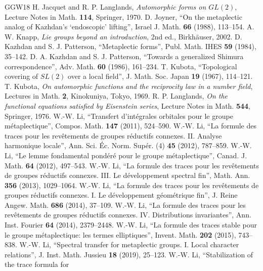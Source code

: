 \documentclass[12pt,letterpaper,openany]{book}
\numberwithin{equation}{chapter}
\theoremstyle{plain}
\theoremstyle{definition}
\theoremstyle{remark}
\theoremstyle{plain}
\begin{document}
\begin{thebibliography}{GGW18}
 H. Jacquet and R. P. Langlands, \emph{Automorphic forms on
$GL(2)$}, Lecture Notes in Math. \textbf{114}, Springer, 1970.
 D. Joyner, ``On the metaplectic analog of Kazhdan's
`endoscopic' lifting'', Israel J. Math. \textbf{66} (1988), 113--154.
 A. W. Knapp, \emph{Lie groups beyond an introduction}, 2nd ed.,
Birkh\"auser, 2002.
 D. Kazhdan and S. J. Patterson, ``Metaplectic forms'', Publ.
Math. IHES \textbf{59} (1984), 35--142.
 D. A. Kazhdan and S. J. Patterson, ``Towards a
generalized Shimura correspondence'', Adv. Math. \textbf{60} (1986),
161--234.
 T. Kubota, ``Topological covering of $SL(2)$ over a local
field'', J. Math. Soc. Japan \textbf{19} (1967), 114--121.
 T. Kubota, \emph{On automorphic functions and the reciprocity
law in a number field}, Lectures in Math. \textbf{2}, Kinokuniya, Tokyo, 1969.
 R. P. Langlands, \emph{On the functional equations satisfied
by Eisenstein series}, Lecture Notes in Math. \textbf{544}, Springer, 1976.
 W.-W. Li, ``Transfert d'int\'egrales orbitales pour le
groupe m\'etaplectique'', Compos. Math. \textbf{147} (2011), 524--590.
 W.-W. Li, ``La formule des traces pour les rev\^etements
de groupes r\'eductifs connexes. II. Analyse harmonique locale'', Ann. Sci.
\'Ec. Norm. Sup\'er. (4) \textbf{45} (2012), 787--859.
 W.-W. Li, ``Le lemme fondamental pond\'er\'e pour le
groupe m\'etaplectique'', Canad. J. Math. \textbf{64} (2012), 497--543.
 W.-W. Li, ``La formule des traces pour les
rev\^etements de groupes r\'eductifs connexes. III. Le d\'eveloppement
spectral fin'', Math. Ann. \textbf{356} (2013), 1029--1064.
 W.-W. Li, ``La formule des traces pour les rev\^etements
de groupes r\'eductifs connexes. I. Le d\'eveloppement g\'eom\'etrique fin'',
J. Reine Angew. Math. \textbf{686} (2014), 37--109.
 W.-W. Li, ``La formule des traces pour les rev\^etements
de groupes r\'eductifs connexes. IV. Distributions invariantes'', Ann. Inst.
Fourier \textbf{64} (2014), 2379--2448.
 W.-W. Li, ``La formule des traces stable pour le groupe
m\'etaplectique: les termes elliptiques'', Invent. Math. \textbf{202}
(2015), 743--838.
 W.-W. Li, ``Spectral transfer for metaplectic groups.
I. Local character relations'', J. Inst. Math. Jussieu \textbf{18} (2019),
25--123.
 W.-W. Li, ``Stabilization of the trace formula for

\end{thebibliography}
\end{document}

